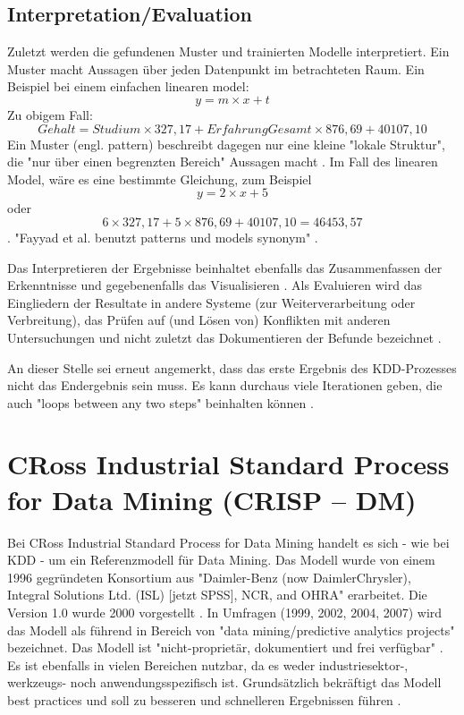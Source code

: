 \subsection{Interpretation/Evaluation}
Zuletzt werden die gefundenen Muster und trainierten Modelle interpretiert. Ein Muster macht Aussagen über jeden Datenpunkt im betrachteten Raum. Ein Beispiel bei einem einfachen linearen \gls{model}: $$y = m \times x + t$$
Zu obigem Fall: $$Gehalt = Studium \times 327,17 + ErfahrungGesamt \times 876,69 + 40107,10$$ Ein Muster (engl. pattern) beschreibt dagegen nur eine kleine "lokale Struktur", die "nur über einen begrenzten Bereich" Aussagen macht \citep[S.~71; eigene Übersetzung]{swamynathan_mastering_2017}. Im Fall des linearen Model, wäre es eine bestimmte Gleichung, zum Beispiel $$y = 2 \times x + 5$$ oder $$ 6 \times 327,17 + 5 \times 876,69 + 40107,10 =  46453,57$$ \citep{kraker_towards_2013}. "Fayyad et al. benutzt patterns und models synonym" \citep{kraker_towards_2013}.\par
Das Interpretieren der Ergebnisse beinhaltet ebenfalls das Zusammenfassen der Erkenntnisse und gegebenenfalls das Visualisieren \citep[S.~71]{swamynathan_mastering_2017}. Als Evaluieren wird das Eingliedern der Resultate in andere Systeme (zur Weiterverarbeitung oder Verbreitung), das Prüfen auf (und Lösen von) Konflikten mit anderen Untersuchungen und nicht zuletzt das Dokumentieren der Befunde bezeichnet \citep[S.~42]{fayyad_data_1996}. \par
An dieser Stelle sei erneut angemerkt, dass das erste Ergebnis des KDD-Prozesses nicht das Endergebnis sein muss. Es kann durchaus viele Iterationen geben, die auch "loops between any two steps" beinhalten können \citep[S.~42]{fayyad_data_1996}.

\section{CRoss Industrial Standard Process for Data Mining (CRISP – DM)}\label{sec:crispdm}
Bei CRoss Industrial Standard Process for Data Mining handelt es sich - wie bei KDD - um ein Referenzmodell für Data Mining. Das Modell wurde von einem 1996 gegründeten Konsortium aus "Daimler-Benz (now DaimlerChrysler), Integral Solutions Ltd. (ISL) [jetzt SPSS], NCR, and OHRA" \citep[S.~13]{shearer_crisp-dm_2000} erarbeitet. Die Version 1.0 wurde 2000 vorgestellt \citep[S.~13]{shearer_crisp-dm_2000}. In Umfragen (1999, 2002, 2004, 2007) wird das Modell als führend in Bereich von "data mining/predictive analytics projects" \citep[S.~72]{swamynathan_mastering_2017} bezeichnet. Das Modell ist "nicht-proprietär, dokumentiert und frei verfügbar" \citep[S.~13; eigene Übersetzung]{shearer_crisp-dm_2000}. Es ist ebenfalls in vielen Bereichen nutzbar, da es weder industriesektor-, werkzeugs- noch anwendungsspezifisch ist. Grundsätzlich bekräftigt das Modell best practices und soll zu besseren und schnelleren Ergebnissen führen \citep[S.~13; eigene Übersetzung]{shearer_crisp-dm_2000}. 


